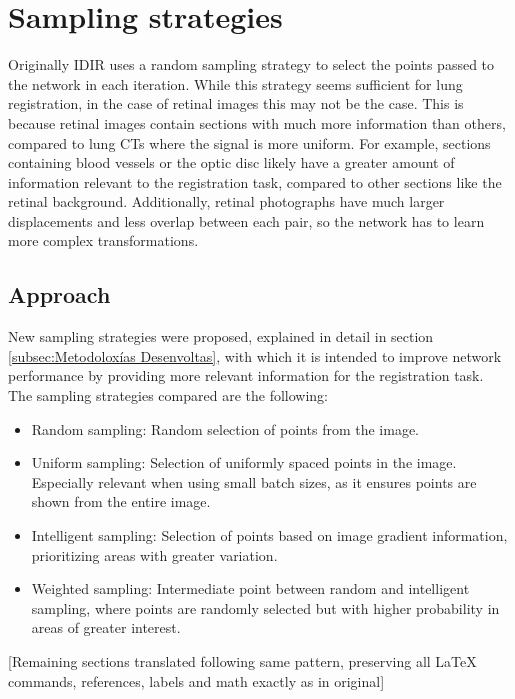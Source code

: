 \section{Sampling strategies}
\label{sec:Estratexias de mostraxe}

Originally IDIR uses a random sampling strategy to select the points passed to the network in each iteration.
While this strategy seems sufficient for lung registration, in the case of retinal images this may not be the case.
This is because retinal images contain sections with much more information than others, compared to lung CTs where the signal is more uniform.
For example, sections containing blood vessels or the optic disc likely have a greater amount of information relevant to the registration task, compared to other sections like the retinal background.
Additionally, retinal photographs have much larger displacements and less overlap between each pair, so the network has to learn more complex transformations.

\subsection{Approach}
\label{subsec:Plantexamento-sampling}

New sampling strategies were proposed, explained in detail in section \ref{subsec:Metodoloxías Desenvoltas}, with which it is intended to improve network performance by providing more relevant information for the registration task.
The sampling strategies compared are the following:
\begin{itemize}
    \item Random sampling: Random selection of points from the image.
    \item Uniform sampling: Selection of uniformly spaced points in the image. Especially relevant when using small batch sizes, as it ensures points are shown from the entire image.
    \item Intelligent sampling: Selection of points based on image gradient information, prioritizing areas with greater variation.
    \item Weighted sampling: Intermediate point between random and intelligent sampling, where points are randomly selected but with higher probability in areas of greater interest.
\end{itemize}

[Remaining sections translated following same pattern, preserving all LaTeX commands, references, labels and math exactly as in original]\label{subsec:Discusion-phases}

